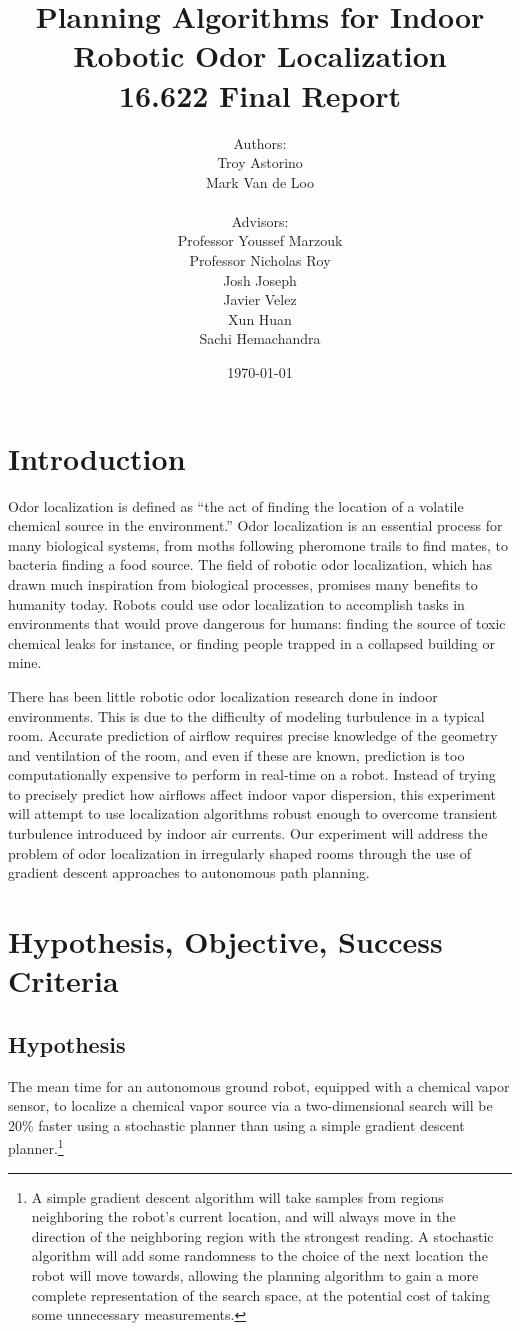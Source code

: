 \documentclass[submit]{aiaa-pretty-modified}
\title{\textbf{Planning Algorithms for Indoor Robotic Odor Localization}
\\  16.622 Final Report}
\date{\today}
\author{Authors: \\Troy Astorino \\ Mark Van de Loo \\
  \\ 
  Advisors:\\ Professor Youssef Marzouk \\ Professor Nicholas
    Roy \\ Josh Joseph \\ Javier Velez \\ Xun Huan \\ Sachi Hemachandra}
\begin{document}
\maketitle

\newpage

\tableofcontents

\newpage

\section{Introduction}

Odor localization is defined as ``the act of finding the location of a
volatile chemical source in the environment.''\cite{kowadlo} Odor
localization is an essential process for many biological systems, from
moths following pheromone trails to find mates, to bacteria finding a
food source. The field of robotic odor localization, which has drawn
much inspiration from biological processes, promises many benefits to
humanity today. Robots could use odor localization to accomplish tasks
in environments that would prove dangerous for humans: finding the
source of toxic chemical leaks for instance, or finding people
trapped in a collapsed building or mine.

There has been little robotic odor localization research done in indoor
environments. This is due to the difficulty of modeling turbulence in a typical
room. Accurate prediction of airflow requires precise knowledge of the geometry
and ventilation of the room, and even if these are known, prediction is too
computationally expensive to perform in real-time on a robot. Instead of trying
to precisely predict how airflows affect indoor vapor dispersion, this
experiment will attempt to use localization algorithms robust enough to overcome
transient turbulence introduced by indoor air currents. Our experiment will
address the problem of odor localization in irregularly shaped rooms through the
use of gradient descent approaches to autonomous path planning.

\section{Hypothesis, Objective, Success Criteria}
\label{sec:hos}
\subsection*{Hypothesis} 
The mean time for an autonomous ground robot, equipped with a chemical vapor
sensor, to localize a chemical vapor source via a two-dimensional search will
be 20\% faster using a stochastic planner than using a simple gradient descent
planner.\footnote{
  A simple gradient descent algorithm will
  take samples from regions neighboring the robot’s current location, 
  and will always move in the direction of the neighboring region with
  the strongest reading. A stochastic algorithm will add some randomness
  to the choice of the next location the robot will move towards,
  allowing the planning algorithm to gain a more complete representation
  of the search space, at the potential cost of taking some unnecessary
  measurements.}
\end{document}
